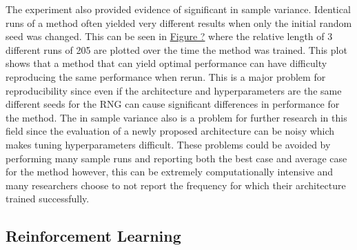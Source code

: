 \documentclass[12pt]{article}
\begin{document}
The experiment also provided evidence of significant in sample variance. Identical runs of a method often yielded very different results when only the initial random seed was changed. This can be seen in  \hyperref[samp_var]{Figure ?} where the relative length of 3 different runs of 205 are plotted over the time the method was trained. This plot shows that a method that can yield optimal performance can have difficulty reproducing the same performance when rerun. This is a major problem for reproducibility since even if the architecture and hyperparameters are the same different seeds for the RNG can cause significant differences in performance for the method. The in sample variance also is a problem for further research in this field since the evaluation of a newly proposed architecture can be noisy which makes tuning hyperparameters difficult. These problems could be avoided by performing many sample runs and reporting both the best case and average case for the method however, this can be extremely computationally intensive and many researchers choose to not report the frequency for which their architecture trained successfully.


\subsection{Reinforcement Learning}




\end{document}
